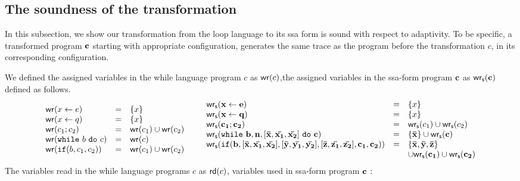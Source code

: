 \documentclass[a4paper,11pt]{article}
\begin{document}
%
%
{
\subsection{The soundness of the transformation}
In this subsection, we show our transformation from the loop language to its ssa form is sound with respect to adaptivity. To be specific, a transformed program $\mathbf{{c}}$ starting with appropriate configuration, generates the same trace as the program before the transformation $c$, in its corresponding configuration.
}
%
%
\begin{defn}
{
We defined the assigned variables in the while language program $c$ as $\mathsf{wr} (c)$,the assigned variables in the ssa-form program $\mathbf{{c}}$ as $\mathsf{wr_s} (\mathbf{{c}})$ defined as follows.
}
\[
\begin{array}{lll}
    \mathsf{wr} (\mathrel{ x \leftarrow e }) & =& \{ x \} \\
    \mathsf{wr} (\mathrel{ x \leftarrow q }) & =& \{ x \} \\
    \mathsf{wr} ( c_1; c_2  )  & = & \mathsf{wr} (c_1) \cup \mathsf{wr} (c_2) \\
    {\mathsf{wr} (  \mathtt{while} ~ b ~ \mathtt{do} ~ c  )} &= &  \mathsf{wr} (c) \\
    \mathsf{wr} (\mathtt{if}(b, c_1, c_2)) & =&  \mathsf{wr} (c_1) \cup \mathsf{wr} (c_2)\\
\end{array} ~~~~~
\begin{array}{lll}
    \mathsf{wr_s} (\mathbf{{\mathrel{ x \leftarrow e }}}) & =& \{ x \} \\
    \mathsf{wr_s} (\mathbf{{\mathrel{ x \leftarrow q }}}) & =& \{ x \} \\
    \mathsf{wr_s} ( \mathbf{{c_1; c_2 }} )  & = & \mathsf{wr_s} (c_1) \cup \mathsf{wr_s} (c_2) \\
    {\mathsf{wr_s} ( \mathtt{while} ~ \mathbf{{b, n, [\bar{x}, \bar{x_1}, \bar{x_2}] ~ \mathtt{do} ~ c}}  ) }
    & = &  
    \{\mathbf{{\bar{x}}}\} \cup \mathsf{wr_s} (\mathbf{{c}}) \\
    \mathsf{wr_s} (\mathtt{if}(\mathbf{{b,[\bar{x}, \bar{x_1}, \bar{x_2}],[\bar{y}, \bar{y_1}, \bar{y_2}],[\bar{z}, \bar{z_1}, \bar{z_2}], c_1, c_2}} )) & =&  \{ \mathbf{{\bar{x}}},\mathbf{{\bar{y}}} , \mathbf{{\bar{z}}} \} \\ && \cup \mathsf{wr_s} (\mathbf{{c_1}}) \cup \mathsf{wr_s} (\mathbf{{c_2}})\\
\end{array}
\]
{
The variables read in the while language programs $c$ as $\mathsf{rd} (c)$, variables used in ssa-form program $\mathbf{{c}}$ : 
}
\[
\begin{array}{lll}

\end{array}\]
\end{defn}
\end{document}
